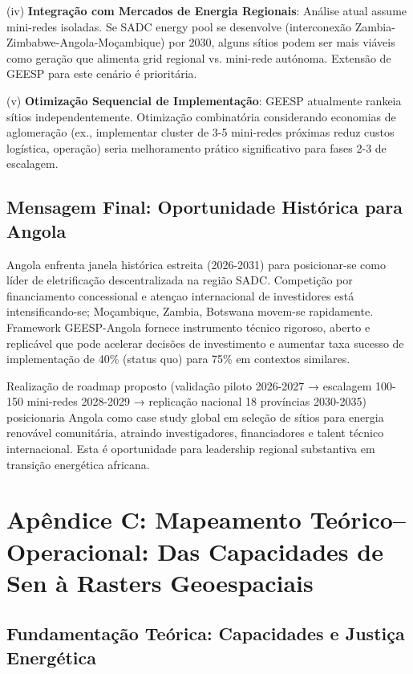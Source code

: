 \documentclass[12pt, a4paper]{article}
\begin{document}
(iv) \textbf{Integração com Mercados de Energia Regionais}: Análise atual assume mini-redes isoladas. Se SADC energy pool se desenvolve (interconexão Zambia-Zimbabwe-Angola-Moçambique) por 2030, alguns sítios podem ser mais viáveis como geração que alimenta grid regional vs. mini-rede autónoma. Extensão de GEESP para este cenário é prioritária.

(v) \textbf{Otimização Sequencial de Implementação}: GEESP atualmente rankeia sítios independentemente. Otimização combinatória considerando economias de aglomeração (ex., implementar cluster de 3-5 mini-redes próximas reduz custos logística, operação) seria melhoramento prático significativo para fases 2-3 de escalagem.

\subsection{Mensagem Final: Oportunidade Histórica para Angola}

Angola enfrenta janela histórica estreita (2026-2031) para posicionar-se como líder de eletrificação descentralizada na região SADC. Competição por financiamento concessional e atençao internacional de investidores está intensificando-se; Moçambique, Zambia, Botswana movem-se rapidamente. Framework GEESP-Angola fornece instrumento técnico rigoroso, aberto e replicável que pode acelerar decisões de investimento e aumentar taxa sucesso de implementação de 40\% (status quo) para 75\% em contextos similares.

Realização de roadmap proposto (validação piloto 2026-2027 → escalagem 100-150 mini-redes 2028-2029 → replicação nacional 18 províncias 2030-2035) posicionaria Angola como case study global em seleção de sítios para energia renovável comunitária, atraindo investigadores, financiadores e talent técnico internacional. Esta é oportunidade para leadership regional substantiva em transição energética africana.


\section{Apêndice C: Mapeamento Teórico--Operacional: Das Capacidades de Sen à Rasters Geoespaciais}

\subsection{Fundamentação Teórica: Capacidades e Justiça Energética}
\end{document}
